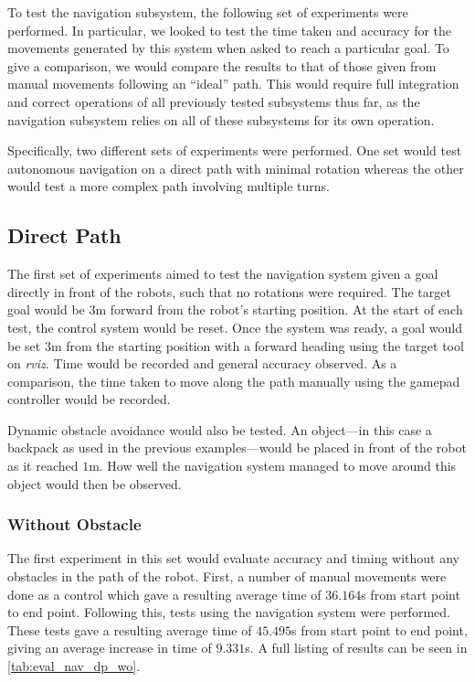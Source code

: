 To test the navigation subsystem, the following set of experiments were performed. In particular, we looked to test the time taken and accuracy for the movements generated by this system when asked to reach a particular goal. To give a comparison, we would compare the results to that of those given from manual movements following an ``ideal'' path. This would require full integration and correct operations of all previously tested subsystems thus far, as the navigation subsystem relies on all of these subsystems for its own operation. 

Specifically, two different sets of experiments were performed. One set would test autonomous navigation on a direct path with minimal rotation whereas the other would test a more complex path involving multiple turns.

\subsection{Direct Path}

The first set of experiments aimed to test the navigation system given a goal directly in front of the robots, such that no rotations were required. The target goal would be $3$m forward from the robot's starting position. At the start of each test, the control system would be reset. Once the system was ready, a goal would be set $3$m from the starting position with a forward heading using the target tool on \emph{rviz}. Time would be recorded and general accuracy observed. As a comparison, the time taken to move along the path manually using the gamepad controller would be recorded. 

Dynamic obstacle avoidance would also be tested. An object---in this case a backpack as used in the previous examples---would be placed in front of the robot as it reached $1$m. How well the navigation system managed to move around this object would then be observed.

\subsubsection{Without Obstacle}

The first experiment in this set would evaluate accuracy and timing without any obstacles in the path of the robot. First, a number of manual movements were done as a control which gave a resulting average time of $36.164$s from start point to end point. Following this, tests using the navigation system were performed. These tests gave a resulting average time of $45.495$s from start point to end point, giving an average increase in time of $9.331$s. A full listing of results can be seen in \autoref{tab:eval_nav_dp_wo}.

